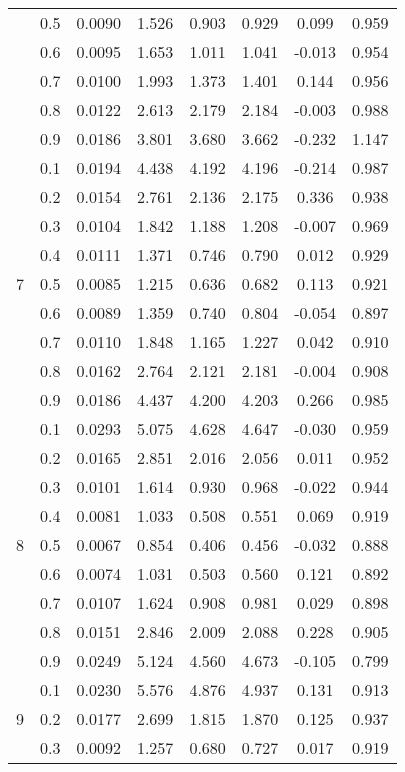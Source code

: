 \documentclass[11pt,a4paper]{report}
\begin{document}
\begin{longtable}{ | c | c || c | c | c | c | c | c | }
 & 0.5 & 0.0090 & 1.526 & 0.903 & 0.929 & 0.099 & 0.959 \\
 & 0.6 & 0.0095 & 1.653 & 1.011 & 1.041 & -0.013 & 0.954 \\
 & 0.7 & 0.0100 & 1.993 & 1.373 & 1.401 & 0.144 & 0.956 \\
 & 0.8 & 0.0122 & 2.613 & 2.179 & 2.184 & -0.003 & 0.988 \\
 & 0.9 & 0.0186 & 3.801 & 3.680 & 3.662 & -0.232 & 1.147 \\
 \hline
\multirow{9}{*}{7} & 0.1 & 0.0194 & 4.438 & 4.192 & 4.196 & -0.214 & 0.987 \\
 & 0.2 & 0.0154 & 2.761 & 2.136 & 2.175 & 0.336 & 0.938 \\
 & 0.3 & 0.0104 & 1.842 & 1.188 & 1.208 & -0.007 & 0.969 \\
 & 0.4 & 0.0111 & 1.371 & 0.746 & 0.790 & 0.012 & 0.929 \\
 & 0.5 & 0.0085 & 1.215 & 0.636 & 0.682 & 0.113 & 0.921 \\
 & 0.6 & 0.0089 & 1.359 & 0.740 & 0.804 & -0.054 & 0.897 \\
 & 0.7 & 0.0110 & 1.848 & 1.165 & 1.227 & 0.042 & 0.910 \\
 & 0.8 & 0.0162 & 2.764 & 2.121 & 2.181 & -0.004 & 0.908 \\
 & 0.9 & 0.0186 & 4.437 & 4.200 & 4.203 & 0.266 & 0.985 \\
 \hline
\multirow{9}{*}{8} & 0.1 & 0.0293 & 5.075 & 4.628 & 4.647 & -0.030 & 0.959 \\
 & 0.2 & 0.0165 & 2.851 & 2.016 & 2.056 & 0.011 & 0.952 \\
 & 0.3 & 0.0101 & 1.614 & 0.930 & 0.968 & -0.022 & 0.944 \\
 & 0.4 & 0.0081 & 1.033 & 0.508 & 0.551 & 0.069 & 0.919 \\
 & 0.5 & 0.0067 & 0.854 & 0.406 & 0.456 & -0.032 & 0.888 \\
 & 0.6 & 0.0074 & 1.031 & 0.503 & 0.560 & 0.121 & 0.892 \\
 & 0.7 & 0.0107 & 1.624 & 0.908 & 0.981 & 0.029 & 0.898 \\
 & 0.8 & 0.0151 & 2.846 & 2.009 & 2.088 & 0.228 & 0.905 \\
 & 0.9 & 0.0249 & 5.124 & 4.560 & 4.673 & -0.105 & 0.799 \\
 \hline
\multirow{9}{*}{9} & 0.1 & 0.0230 & 5.576 & 4.876 & 4.937 & 0.131 & 0.913 \\
 & 0.2 & 0.0177 & 2.699 & 1.815 & 1.870 & 0.125 & 0.937 \\
 & 0.3 & 0.0092 & 1.257 & 0.680 & 0.727 & 0.017 & 0.919 \\

\end{longtable}
\end{document}

